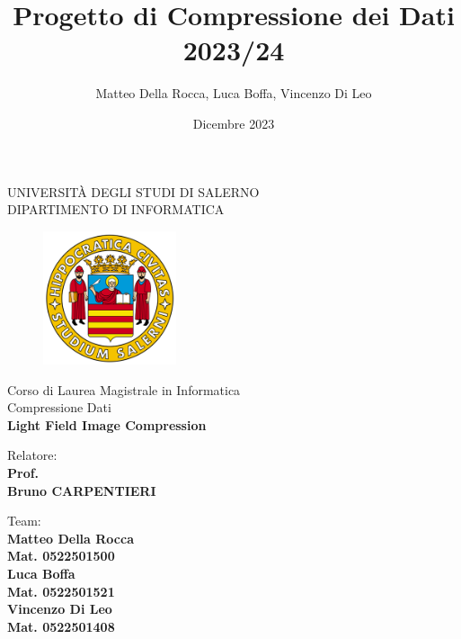 \documentclass[a4paper, 11pt, oneside]{book}
\title{Progetto di Compressione dei Dati 2023/24}
\author{Matteo Della Rocca, Luca Boffa, Vincenzo Di Leo}
\date{Dicembre 2023}
\begin{document}
\begin{titlepage}
    \begin{center}
        \LARGE{\uppercase{Università degli Studi di Salerno}}\\
        \vspace{5mm}
    	\uppercase{\normalsize Dipartimento di Informatica}\\
    \end{center}
    \begin{figure}[H]
        \centering
        \includegraphics[width=0.35\textwidth]{logo_unisa}
    \end{figure}
    
    \begin{center}
    	\normalsize{ Corso di Laurea Magistrale in Informatica \\ Compressione Dati}\\
            
    	\vspace{15mm}
        {\LARGE{\bf Light Field Image Compression}}\\
    	\vspace{3mm}
    \end{center}
    
    \vspace{15mm}
    \noindent
    \begin{minipage}[t]{0.47\textwidth}
    	{\large{ Relatore:\\\bf Prof. \\Bruno CARPENTIERI}}
    	\vspace{12mm}\\
    \end{minipage}
    \hfill
    \begin{minipage}[t]{0.4\textwidth}\raggedleft
    	{\large{Team: \\ \bf Matteo Della Rocca\\ Mat. 0522501500}}
     {\large{\\ \bf Luca Boffa\\ Mat. 0522501521}}
     {\large{\\ \bf Vincenzo Di Leo\\ Mat. 0522501408}}
            
    \end{minipage}
    
    \vspace{20mm}
    

\end{titlepage}
\end{document}
